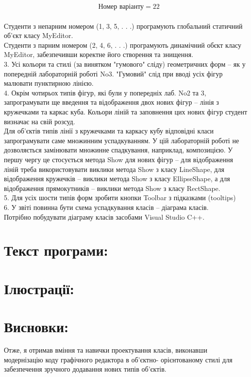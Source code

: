 \documentclass[14pt]{article}
\begin{document}
    \begin{align}
        &\text{Номер варіанту} = 22
    \end{align}\\
    Студенти з непарним номером (1, 3, 5, . . .) програмують глобальний статичний об'єкт класу MyEditor.\\
    Студенти з парним номером (2, 4, 6, . . .) програмують динамічний обєкт класу MyEditor, забезпечивши коректне його створення та знищення.\\
    3. Усі кольори та стилі (за винятком "гумового" сліду) геометричних форм – як у попередній лабораторній роботі No3. "Гумовий" слід при вводі усіх фігур малювати пунктирною лінією. \\
    4. Окрім чотирьох типів фігур, які були у попередніх лаб. No2 та 3, запрограмувати ще введення та відображення двох нових фігур – лінія з кружечками та каркас куба. Кольори ліній та заповнення цих нових фігур студент визначає на свій розсуд.\\
    Для об’єктів типів лінії з кружечками та каркасу кубу відповідні класи запрограмувати саме множинним успадкуванням. У цій лабораторній роботі не дозволяється замінювати множинне спадкування, наприклад, композицією. У першу чергу це стосується метода Show для нових фігур – для відображення ліній треба використовувати виклики метода Show з класу LineShape, для відображення кружечків – виклики метода Show з класу EllipseShape, а для відображення прямокутників – виклики метода Show з класу RectShape.\\
    5. Для усіх шости типів форм зробити кнопки Toolbar з підказками (tooltips)\\
    6. У звіті повинна бути схема успадкування класів – діаграма класів.\\
    Потрібно побудувати діаграму класів засобами Visual Studio C++.\\


    \section{Текст програми:}
    


    \section{Ілюстрації:}
    


    \section{Висновки:}
    Отже, я отримав вміння та навички проектування класів, виконавши модернізацію коду графічного редактора в об’єктно- орієнтованому стилі для забезпечення зручного додавання нових типів об'єктів.
\end{document}
